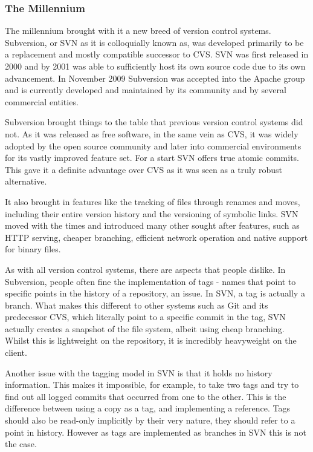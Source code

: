\subsubsection{The Millennium}
The millennium brought with it a new breed of version control systems.  Subversion, or SVN as it is colloquially known as, was developed primarily to be a replacement and mostly compatible successor to CVS.  SVN was first released in 2000 and by 2001 was able to sufficiently host its own source code due to its own advancement.  In November 2009 Subversion was accepted into the Apache group and is currently developed and maintained by its community and by several commercial entities.

Subversion brought things to the table that previous version control systems did not.  As it was released as free software, in the same vein as CVS, it was widely adopted by the open source community and later into commercial environments for its vastly improved feature set.  For a start SVN offers true atomic commits.  This gave it a definite advantage over CVS as it was seen as a truly robust alternative.

It also brought in features like the tracking of files through renames and moves, including their entire version history and the versioning of symbolic links.  SVN moved with the times and introduced many other sought after features, such as HTTP serving, cheaper branching, efficient network operation and native support for binary files.  

As with all version control systems, there are aspects that people dislike.  In Subversion, people often fine the implementation of tags - names that point to specific points in the history of a repository, an issue.  In SVN, a tag is actually a branch.  What makes this different to other systems such as Git and its predecessor CVS, which literally point to a specific commit in the tag, SVN actually creates a snapshot of the file system, albeit using cheap branching.  Whilst this is lightweight on the repository, it is incredibly heavyweight on the client.

Another issue with the tagging model in SVN is that it holds no history information.  This makes it impossible, for example, to take two tags and try to find out all logged commits that occurred from one to the other.  This is the difference between using a copy as a tag, and implementing a reference.  Tags should also be read-only implicitly by their very nature, they should refer to a point in history.  However as tags are implemented as branches in SVN this is not the case.


